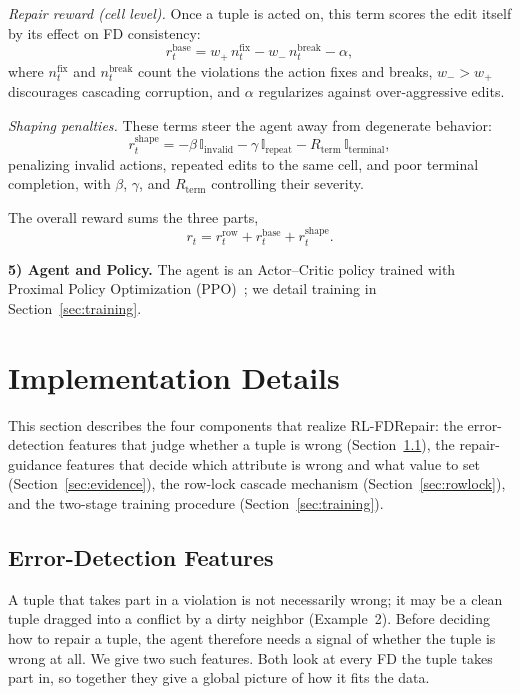 \documentclass[sigconf]{acmart}
\begin{document}
\textit{Repair reward (cell level).} Once a tuple is acted on, this term scores the edit itself by its effect on FD consistency:
\begin{equation}
r_t^{\text{base}} = w_{+}\, n_t^{\text{fix}} - w_{-}\, n_t^{\text{break}} - \alpha,
\end{equation}
where $n_t^{\text{fix}}$ and $n_t^{\text{break}}$ count the violations the action fixes and breaks, $w_{-} > w_{+}$ discourages cascading corruption, and $\alpha$ regularizes against over-aggressive edits.

\textit{Shaping penalties.} These terms steer the agent away from degenerate behavior:
\begin{equation}
r_t^{\text{shape}} = - \beta\, \mathbb{I}_{\text{invalid}} - \gamma\, \mathbb{I}_{\text{repeat}} - R_{\text{term}}\, \mathbb{I}_{\text{terminal}},
\end{equation}
penalizing invalid actions, repeated edits to the same cell, and poor terminal completion, with $\beta$, $\gamma$, and $R_{\text{term}}$ controlling their severity.

The overall reward sums the three parts,
\begin{equation}
r_t = r_t^{\text{row}} + r_t^{\text{base}} + r_t^{\text{shape}}.
\end{equation}

\noindent\textbf{5) Agent and Policy.}
The agent is an Actor--Critic policy trained with Proximal Policy Optimization (PPO)~\cite{b3}; we detail training in Section~\ref{sec:training}.

\section{Implementation Details}
\label{sec:implementation}

This section describes the four components that realize RL-FDRepair: the error-detection features that judge whether a tuple is wrong (Section~\ref{sec:detect}), the repair-guidance features that decide which attribute is wrong and what value to set (Section~\ref{sec:evidence}), the row-lock cascade mechanism (Section~\ref{sec:rowlock}), and the two-stage training procedure (Section~\ref{sec:training}).


\subsection{Error-Detection Features}
\label{sec:detect}

A tuple that takes part in a violation is not necessarily wrong; it may be a clean tuple dragged into a conflict by a dirty neighbor (Example~2). Before deciding how to repair a tuple, the agent therefore needs a signal of whether the tuple is wrong at all. We give two such features. Both look at every FD the tuple takes part in, so together they give a global picture of how it fits the data.
\end{document}
